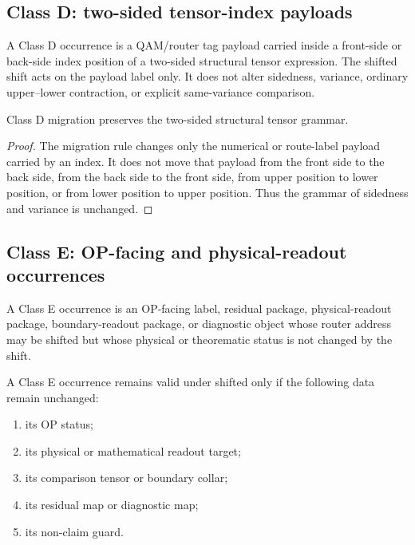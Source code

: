 \subsection{Class D: two-sided tensor-index payloads}
\label{subsec:v400-r02-class-d-two-sided-tensor-index-payloads}

\begin{definition}
\label{def:v400-r02-class-d-occurrence}
A Class D occurrence is a QAM/router tag payload carried inside a front-side or
back-side index position of a two-sided structural tensor expression. The shifted
shift acts on the payload label only. It does not alter sidedness, variance,
ordinary upper--lower contraction, or explicit same-variance comparison.
\end{definition}

\begin{proposition}
\label{prop:v400-r02-class-d-grammar-invariance}
Class D migration preserves the two-sided structural tensor grammar.
\end{proposition}

\begin{proof}
The migration rule changes only the numerical or route-label payload carried by
an index. It does not move that payload from the front side to the back side,
from the back side to the front side, from upper position to lower position, or
from lower position to upper position. Thus the grammar of sidedness and
variance is unchanged.
\end{proof}

\subsection{Class E: OP-facing and physical-readout occurrences}
\label{subsec:v400-r02-class-e-op-facing-physical-readout}

\begin{definition}
\label{def:v400-r02-class-e-occurrence}
A Class E occurrence is an OP-facing label, residual package, physical-readout
package, boundary-readout package, or diagnostic object whose router address may
be shifted but whose physical or theorematic status is not changed by the
shift.
\end{definition}

\begin{definition}
\label{def:v400-r02-class-e-invariance-contract}
A Class E occurrence remains valid under shifted only if the following data remain
unchanged:
\begin{enumerate}[leftmargin=*]
 \item its OP status;
 \item its physical or mathematical readout target;
 \item its comparison tensor or boundary collar;
 \item its residual map or diagnostic map;
 \item its non-claim guard.
\end{enumerate}
\end{definition}

